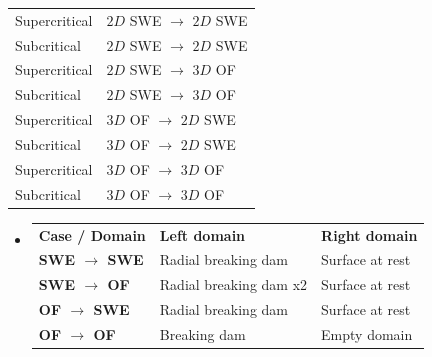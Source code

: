 
\begin{frame}
\begin{minipage}{0.35\textwidth}
\begin{tcolorbox}[title= \textbf{Mapping setups}, colframe=TUMOrange,
colback=TUMOrange!30] 
\begin{table}[]
\begin{tabular}{ll}
Supercritical & $2D$ SWE  $\rightarrow$  $2D$ SWE     \\ 
Subcritical   & $2D$ SWE  $\rightarrow$  $2D$ SWE     \\[0.3cm]
Supercritical & $2D$ SWE  $\rightarrow$  $3D$ OF      \\ 
Subcritical   & $2D$ SWE  $\rightarrow$  $3D$ OF      \\[0.3cm]
Supercritical & $3D$ OF   $\rightarrow$  $2D$ SWE     \\ 
Subcritical   & $3D$ OF   $\rightarrow$  $2D$ SWE     \\[0.3cm]
Supercritical & $3D$ OF   $\rightarrow$  $3D$ OF      \\ 
Subcritical   & $3D$ OF   $\rightarrow$  $3D$ OF      \\ 
\end{tabular}
\end{table}
\end{tcolorbox}
\end{minipage}
\hspace{1cm}
\begin{minipage}{.55\textwidth}
\addtolength{\leftmargini}{-0.8cm}
\begin{itemize}
\item<2->[]
\begin{tcolorbox}[title= \textbf{Supercritical Cases}, colframe=TUMGreen,
colback=TUMGreen!30] 
\begin{table}[!h]
\centering
\begin{tabular}{lll}
\textbf{Case / Domain} & \textbf{Left domain} & \textbf{Right domain} \\[0.3cm]
\textbf{SWE $\rightarrow$ SWE} & Radial breaking dam      & Surface at rest      \\[0.1cm]
\textbf{SWE $\rightarrow$ OF}  & Radial breaking dam x2   & Surface at rest      \\[0.1cm]
\textbf{OF $\rightarrow$ SWE}  & Radial breaking dam   & Surface at rest   \\[0.1cm]
\textbf{OF $\rightarrow$ OF}   & Breaking dam      & Empty domain

\end{tabular}
\end{table}
\end{tcolorbox}
\end{itemize}
\end{minipage}
\end{frame}
